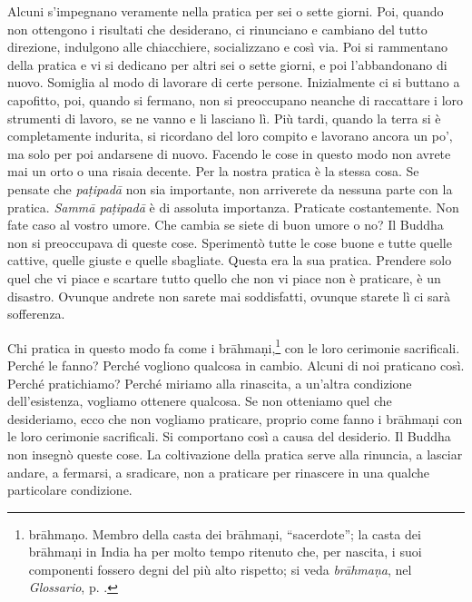 Alcuni s'impegnano veramente nella pratica per sei o sette giorni. Poi,
quando non ottengono i risultati che desiderano, ci rinunciano e
cambiano del tutto direzione, indulgono alle chiacchiere, socializzano e
così via. Poi si rammentano della pratica e vi si dedicano per altri sei
o sette giorni, e poi l'abbandonano di nuovo. Somiglia al modo di
lavorare di certe persone. Inizialmente ci si buttano a capofitto, poi,
quando si fermano, non si preoccupano neanche di raccattare i loro
strumenti di lavoro, se ne vanno e li lasciano lì. Più tardi, quando la
terra si è completamente indurita, si ricordano del loro compito e
lavorano ancora un po', ma solo per poi andarsene di nuovo. Facendo le
cose in questo modo non avrete mai un orto o una risaia decente. Per la
nostra pratica è la stessa cosa. Se pensate che \emph{paṭipadā} non sia
importante, non arriverete da nessuna parte con la pratica. \emph{Sammā
paṭipadā} è di assoluta importanza. Praticate costantemente. Non fate
caso al vostro umore. Che cambia se siete di buon umore o no? Il Buddha
non si preoccupava di queste cose. Sperimentò tutte le cose buone e
tutte quelle cattive, quelle giuste e quelle sbagliate. Questa era la
sua pratica. Prendere solo quel che vi piace e scartare tutto quello che
non vi piace non è praticare, è un disastro. Ovunque andrete non sarete
mai soddisfatti, ovunque starete lì ci sarà sofferenza.

Chi pratica in questo modo fa come i brāhmaṇi,\footnote{brāhmaṇo. Membro
  della casta dei brāhmaṇi, ``sacerdote''; la casta dei brāhmaṇi in
  India ha per molto tempo ritenuto che, per nascita, i suoi componenti
  fossero degni del più alto rispetto; si veda \emph{brāhmaṇa}, nel
  \emph{Glossario}, p. \pageref{glossary-brahmana}.} con le loro cerimonie sacrificali. Perché le fanno?
Perché vogliono qualcosa in cambio. Alcuni di noi praticano così. Perché
pratichiamo? Perché miriamo alla rinascita, a un'altra condizione
dell'esistenza, vogliamo ottenere qualcosa. Se non otteniamo quel che
desideriamo, ecco che non vogliamo praticare, proprio come fanno i
brāhmaṇi con le loro cerimonie sacrificali. Si comportano così a causa
del desiderio. Il Buddha non insegnò queste cose. La coltivazione della
pratica serve alla rinuncia, a lasciar andare, a fermarsi, a sradicare,
non a praticare per rinascere in una qualche particolare condizione.

